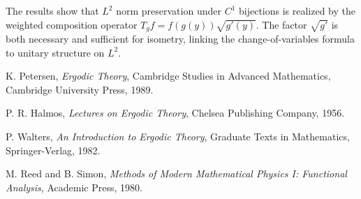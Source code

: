 \documentclass{article}
\newcommand{\tmem}[1]{{\em #1\/}}
\begin{document}
The results show that $L^2$ norm preservation under $C^1$ bijections is
realized by the weighted composition operator $T_g f = f (g (y)) \sqrt{g'
(y)}$. The factor $\sqrt{g'}$ is both necessary and sufficient for isometry,
linking the change-of-variables formula to unitary structure on $L^2$.

\begin{thebibliography}{9}
  {}K. Petersen, {\tmem{Ergodic Theory}},
  Cambridge Studies in Advanced Mathematics, Cambridge University Press, 1989.
  
  {}P. R. Halmos, {\tmem{Lectures on Ergodic
  Theory}}, Chelsea Publishing Company, 1956.
  
  {}P. Walters, {\tmem{An Introduction to
  Ergodic Theory}}, Graduate Texts in Mathematics, Springer-Verlag, 1982.
  
  {}M. Reed and B. Simon, {\tmem{Methods of Modern
  Mathematical Physics I: Functional Analysis}}, Academic Press, 1980.
\end{thebibliography}
\end{document}
